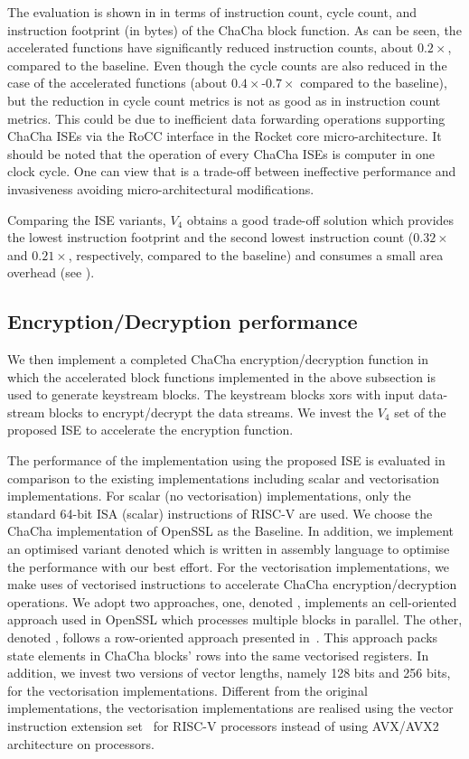 The evaluation is shown in  in terms of instruction count, cycle count, and instruction footprint (in bytes) of the ChaCha block function. As can be seen, the accelerated functions have significantly reduced instruction counts, about $0.2\times$, compared to the baseline. Even though the cycle counts are also reduced in the case of the accelerated functions (about $0.4\times$-$0.7\times$ compared to the baseline), but the reduction in cycle count metrics is not as good as in instruction count metrics. This could be due to inefficient data forwarding operations supporting ChaCha ISEs via the RoCC interface in the Rocket core micro-architecture. It should be noted that the operation of every ChaCha ISEs is computer in one clock cycle. One can view that is a trade-off between ineffective performance and invasiveness avoiding micro-architectural modifications.

Comparing the ISE variants, $V_4$ obtains a good trade-off solution which provides the lowest instruction footprint and the second lowest instruction count ($0.32\times$ and $0.21\times$, respectively, compared to the baseline) and consumes a small area overhead (see ).

\subsection{Encryption/Decryption performance}
We then implement a completed ChaCha encryption/decryption function in which the accelerated block functions implemented in the above subsection is used to generate keystream blocks. The keystream blocks xors with input data-stream blocks to encrypt/decrypt the data streams. We invest the $V_4$ set of the proposed ISE to accelerate the encryption function. 

The performance of the implementation using the proposed ISE is evaluated in comparison to the existing implementations including scalar and vectorisation implementations.  
For scalar (no vectorisation) implementations, only the standard 64-bit ISA (scalar) instructions of RISC-V are used. We choose the ChaCha implementation of OpenSSL as the Baseline. In addition, we implement an optimised variant denoted  which is written in assembly language to optimise the performance with our best effort. 
For the vectorisation implementations, we make uses of vectorised instructions to accelerate ChaCha encryption/decryption operations. 
We adopt two approaches, one, denoted , implements an cell-oriented approach used in OpenSSL which processes multiple blocks in parallel.
The other, denoted , follows a row-oriented approach presented in~\cite{GolGue:14}. This approach packs state elements in ChaCha blocks' rows into the same vectorised registers.
In addition, we invest two versions of vector lengths, namely 128 bits and 256 bits, for the vectorisation implementations. 
Different from the original implementations, the vectorisation implementations are realised using the vector instruction extension set~\cite{riscv:ext:vector:draft} for RISC-V processors instead of using AVX/AVX2 architecture on  processors.

